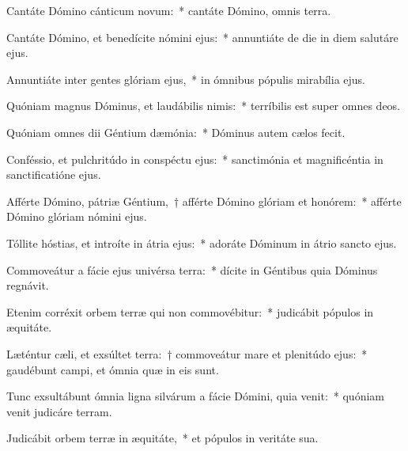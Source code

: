 \item Cantáte Dómino cánticum novum:~* cantáte Dómino, omnis terra.

\item Cantáte Dómino, et benedícite nómini ejus:~* annuntiáte de die in diem salutáre ejus.

\item Annuntiáte inter gentes glóriam ejus,~* in ómnibus pópulis mirabília ejus.

\item Quóniam magnus Dóminus, et laudábilis nimis:~* terríbilis est super omnes deos.

\item Quóniam omnes dii Géntium dæmónia:~* Dóminus autem cælos fecit.

\item Conféssio, et pulchritúdo in conspéctu ejus:~* sanctimónia et magnificéntia in sanctificatióne ejus.

\item Afférte Dómino, pátriæ Géntium,~† afférte Dómino glóriam et honórem:~* afférte Dómino glóriam nómini ejus.

\item Tóllite hóstias, et introíte in átria ejus:~* adoráte Dóminum in átrio sancto ejus.

\item Commoveátur a fácie ejus univérsa terra:~* dícite in Géntibus quia Dóminus regnávit.

\item Etenim corréxit orbem terræ qui non commovébitur:~* judicábit pópulos in æquitáte.

\item Læténtur cæli, et exsúltet terra:~† commoveátur mare et plenitúdo ejus:~* gaudébunt campi, et ómnia quæ in eis sunt.

\item Tunc exsultábunt ómnia ligna silvárum a fácie Dómini, quia venit:~* quóniam venit judicáre terram.

\item Judicábit orbem terræ in æquitáte,~* et pópulos in veritáte sua.
